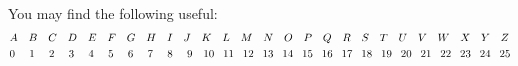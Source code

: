 \documentclass[11pt,addpoints,letterpaper]{exam}
\begin{document}
You may find the following useful:
\begin{align*}
&A\hspace{.35cm} B\hspace{.35cm}C\hspace{.35cm}D\hspace{.35cm}E\hspace{.35cm}F\hspace{.35cm}G\hspace{.35cm}H\hspace{.35cm}I\hspace{.35cm}J\hspace{.35cm}K\hspace{.35cm}L\hspace{.35cm}M\hspace{.35cm}N\hspace{.35cm}O\hspace{.35cm}P\hspace{.35cm}Q\hspace{.35cm}R\hspace{.35cm}S\hspace{.35cm}T\hspace{.35cm}U\hspace{.35cm}V\hspace{.35cm}W\hspace{.35cm}X\hspace{.35cm}Y\hspace{.35cm}Z\\
&0\hspace{.46cm} 1\hspace{.46cm} 2\hspace{.46cm} 3\hspace{.46cm} 4\hspace{.46cm} 5\hspace{.46cm} 6\hspace{.46cm} 7\hspace{.46cm} 8\hspace{.46cm} 9\hspace{.35cm} 10\hspace{.285cm} 11\hspace{.285cm} 12\hspace{.285cm} 13\hspace{.285cm} 14\hspace{.285cm} 15\hspace{.285cm}16\hspace{.285cm}17\hspace{.285cm}18\hspace{.285cm}19\hspace{.285cm}20\hspace{.285cm}21\hspace{.285cm}22\hspace{.285cm}23\hspace{.285cm}24\hspace{.285cm}25
\end{align*}
\end{document}
